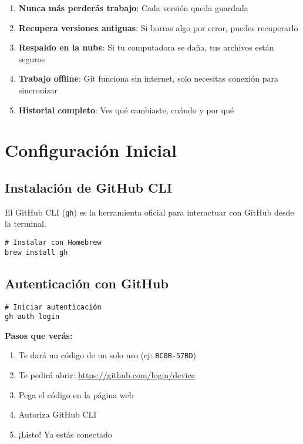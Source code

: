 \documentclass[12pt,a4paper]{article}
\begin{document}
\begin{successbox}
\begin{enumerate}
  \item \textbf{Nunca más perderás trabajo}: Cada versión queda guardada
  \item \textbf{Recupera versiones antiguas}: Si borras algo por error, puedes recuperarlo
  \item \textbf{Respaldo en la nube}: Si tu computadora se daña, tus archivos están seguros
  \item \textbf{Trabajo offline}: Git funciona sin internet, solo necesitas conexión para sincronizar
  \item \textbf{Historial completo}: Ves qué cambiaste, cuándo y por qué
\end{enumerate}
\end{successbox}

\section{Configuración Inicial}

\subsection{Instalación de GitHub CLI}

El GitHub CLI (\texttt{gh}) es la herramienta oficial para interactuar con GitHub desde la terminal.

\begin{lstlisting}[style=bashstyle]
# Instalar con Homebrew
brew install gh
\end{lstlisting}

\subsection{Autenticación con GitHub}

\begin{lstlisting}[style=bashstyle]
# Iniciar autenticación
gh auth login
\end{lstlisting}

\textbf{Pasos que verás:}
\begin{enumerate}
  \item Te dará un código de un solo uso (ej: \texttt{BC0B-57BD})
  \item Te pedirá abrir: \url{https://github.com/login/device}
  \item Pega el código en la página web
  \item Autoriza GitHub CLI
  \item ¡Listo! Ya estás conectado
\end{enumerate}
\end{document}
